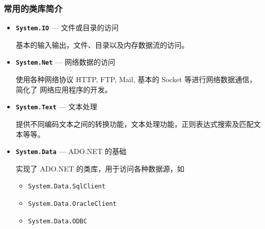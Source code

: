 \begin{frame}
\frametitle{常用的类库简介}
\begin{itemize}
  \CJKindent
\item \texttt{\textbf{System.IO}} --- 文件或目录的访问    \smallskip

  \small 基本的输入输出，文件、目录以及内存数据流的访问。
  \smallskip
\item \texttt{\textbf{System.Net}} --- 网络数据的访问    \smallskip

  \small 使用各种网络协议 HTTP, FTP, Mail, 基本的 Socket 等进行网络数据通信，简化了
  网络应用程序的开发。
  \smallskip
\item \texttt{\textbf{System.Text}} --- 文本处理    \smallskip

  \small 提供不同编码文本之间的转换功能，文本处理功能，正则表达式搜索及匹配文本等等。
  \smallskip
\item \texttt{\textbf{System.Data}} --- ADO.NET 的基础    \smallskip

  \small 实现了 ADO.NET 的类库，用于访问各种数据源，如
  \begin{itemize}
  \item \texttt{System.Data.SqlClient}
  \item \texttt{System.Data.OracleClient}
  \item \texttt{System.Data.ODBC}
  \end{itemize}
  \smallskip


\end{itemize}
\end{frame}

